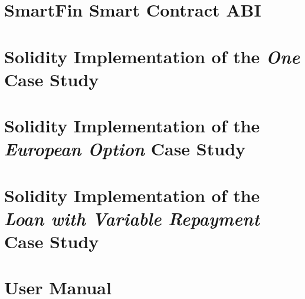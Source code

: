 \appendix
\chapter{SmartFin Smart Contract ABI}

 \label{appx:ABI}


\chapter{Solidity Implementation of the \textit{One} Case Study}

 \label{appx:one-contract}


\chapter{Solidity Implementation of the \textit{European Option} Case Study}

 \label{appx:euro-contract}


\chapter{Solidity Implementation of the \textit{Loan with Variable Repayment} Case Study}

 \label{appx:loan-contract}


\chapter{User Manual} \label{appx:user-manual}

